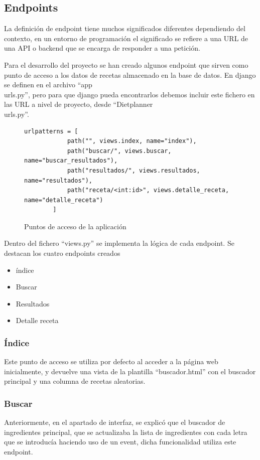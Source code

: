 \subsection{Endpoints}
La definición de \gls{endpoint} tiene muchos significados diferentes dependiendo del contexto, en un entorno de programación el significado se refiere a una URL de una \gls{API} o \gls{backend} que se encarga de responder a una petición. 

Para el desarrollo del proyecto se han creado algunos \gls{endpoint} que sirven como punto de acceso a los datos de recetas almacenado en la base de datos. En \Gls{django} se definen en el archivo ``app\\urls.py'', pero para que \Gls{django} pueda encontrarlos debemos incluir este fichero en las URL a nivel de proyecto, desde ``Dietplanner\\urls.py''. 

\begin{figure}
    \centering
    \begin{lstlisting}[style=consola]
        urlpatterns = [
            path("", views.index, name="index"),
            path("buscar/", views.buscar, name="buscar_resultados"),
            path("resultados/", views.resultados, name="resultados"),
            path("receta/<int:id>", views.detalle_receta, name="detalle_receta")
        ]
    \end{lstlisting}
    \caption{Puntos de acceso de la aplicación}
    \label{sni:endpoints}
\end{figure}

\newpage
Dentro del fichero ``views.py'' se implementa la lógica de cada \gls{endpoint}. Se destacan los cuatro \glspl{endpoint} creados
\begin{itemize}
    \item índice
    \item Buscar
    \item Resultados
    \item Detalle receta
\end{itemize}

\subsubsection{Índice}
Este punto de acceso se utiliza por defecto al acceder a la página web inicialmente, y devuelve una vista de la plantilla ``buscador.html'' con el buscador principal y una columna de recetas aleatorias. 

\subsubsection{Buscar}
Anteriormente, en el apartado de interfaz, se explicó que el buscador de ingredientes principal, que se actualizaba la lista de ingredientes con cada letra que se introducía haciendo uso de un \gls{event}, dicha funcionalidad utiliza este \gls{endpoint}.

